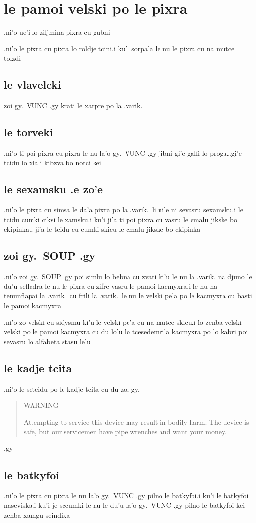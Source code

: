 \documentclass{report}
\begin{document}
\section{le pamoi velski po le pixra}
.ni'o ue'i lo ziljmina pixra cu gubni

.ni'o le pixra cu pixra lo roldje tcini\@  .i ku'i sorpa'a le nu le pixra cu na mutce tolzdi
\subsection{le vlavelcki}
zoi gy.\ VUNC .gy krati le xarpre po la .varik.
\subsection{le torveki}
.ni'o ti poi pixra cu pixra le nu la'o gy.\ VUNC .gy jibni gi'e galfi lo proga\ldots gi'e tcidu lo xlali kibzva bo notci kei
\subsection{le sexamsku .e zo'e}
.ni'o le pixra cu simsa le da'a pixra po la .varik.\ li ni'e ni sevasru sexamsku\@  .i le tcidu cumki ciksi le xamsku\@  .i ku'i ji'a ti poi pixra cu vasru le cmalu jikske bo ckipinka\@  .i ji'a le tcidu cu cumki skicu le cmalu jikske bo ckipinka
\subsection{zoi gy.\ SOUP .gy}
.ni'o zoi gy.\ SOUP .gy poi simlu lo bebna cu zvati ki'u le nu la .varik. na djuno le du'u sefladra le nu le pixra cu zifre vasru le pamoi kacmyxra\@  .i le nu na tenunflapai la .varik.\ cu frili la .varik.\ le nu le velski pe'a po le kacmyxra cu basti le pamoi kacmyxra

.ni'o zo velski cu sidysmu ki'u le velski pe'a cu na mutce skicu\@  .i lo zenba velski velski po le pamoi kacmyxra cu du lo'u lo tcesedemri'a kacmyxra po lo kabri poi sevasru lo alfabeta stasu le'u
\subsection{le kadje tcita}
.ni'o le setcidu po le kadje tcita cu du zoi gy.
\begin{quote}
	WARNING

	Attempting to service this device may result in bodily harm.  The device is safe, but our servicemen have pipe wrenches and want your money.
\end{quote}
.gy
\subsection{le batkyfoi}
.ni'o le pixra cu pixra le nu la'o gy.\ VUNC .gy pilno le batkyfoi\@  .i ku'i le batkyfoi naseviska\@  .i ku'i je secumki le nu le du'u la'o gy.\ VUNC .gy pilno le batkyfoi kei zenba xamgu seindika
\end{document}
